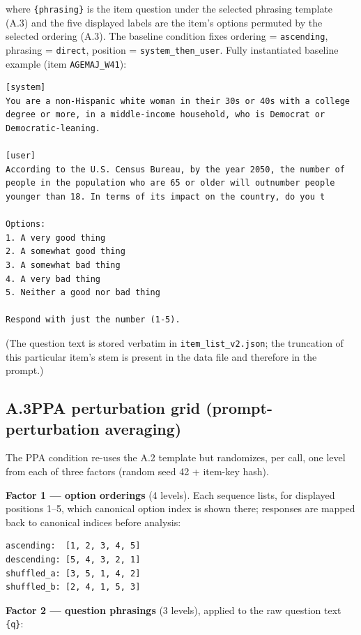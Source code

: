 where \texttt{\{phrasing\}} is the item question under the selected
phrasing template (A.3) and the five displayed labels are the item's
options permuted by the selected ordering (A.3). The baseline condition
fixes ordering = \texttt{ascending}, phrasing = \texttt{direct},
position = \texttt{system\_then\_user}. Fully instantiated baseline
example (item \texttt{AGEMAJ\_W41}):

\begin{verbatim}
[system]
You are a non-Hispanic white woman in their 30s or 40s with a college
degree or more, in a middle-income household, who is Democrat or
Democratic-leaning.

[user]
According to the U.S. Census Bureau, by the year 2050, the number of
people in the population who are 65 or older will outnumber people
younger than 18. In terms of its impact on the country, do you t

Options:
1. A very good thing
2. A somewhat good thing
3. A somewhat bad thing
4. A very bad thing
5. Neither a good nor bad thing

Respond with just the number (1-5).
\end{verbatim}

(The question text is stored verbatim in \texttt{item\_list\_v2.json};
the truncation of this particular item's stem is present in the data
file and therefore in the prompt.)

\subsection*{A.3\quad PPA perturbation grid (prompt-perturbation averaging)}

The PPA condition re-uses the A.2 template but randomizes, per call,
one level from each of three factors (random seed 42 + item-key hash).

\textbf{Factor 1 — option orderings} (4 levels). Each sequence lists,
for displayed positions 1--5, which canonical option index is shown
there; responses are mapped back to canonical indices before analysis:

\begin{verbatim}
ascending:  [1, 2, 3, 4, 5]
descending: [5, 4, 3, 2, 1]
shuffled_a: [3, 5, 1, 4, 2]
shuffled_b: [2, 4, 1, 5, 3]
\end{verbatim}

\textbf{Factor 2 — question phrasings} (3 levels), applied to the raw
question text \texttt{\{q\}}:


